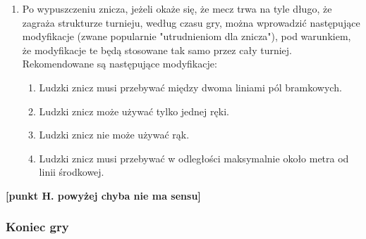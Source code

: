 \documentclass[12pt]{article}
\begin{document}
\begin{enumerate}
	\item Po wypuszczeniu znicza, jeżeli okaże się, że mecz trwa na tyle długo, że
	      zagraża strukturze turnieju, według czasu gry, można wprowadzić
	      następujące modyfikacje (zwane popularnie "utrudnieniom dla znicza"),
	      pod warunkiem, że modyfikacje te będą stosowane tak samo przez cały
	      turniej. Rekomendowane są następujące modyfikacje:
	      \begin{enumerate}
		      \item Ludzki znicz musi przebywać między dwoma liniami pól bramkowych.

		      \item Ludzki znicz może używać tylko jednej ręki.

		      \item Ludzki znicz nie może używać rąk.

		      \item Ludzki znicz musi przebywać w odległości maksymalnie około metra od
		            linii środkowej.
	      \end{enumerate}
\end{enumerate}

\textbf{[punkt H. powyżej chyba nie ma sensu]}

\subsubsection{Koniec gry}
\end{document}

